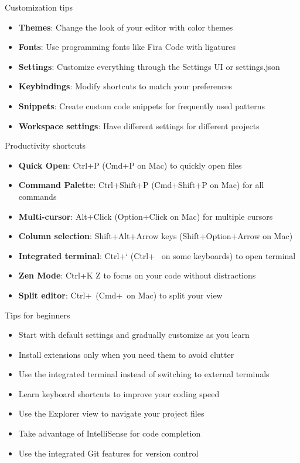 \begin{frame}[fragile]{Customization tips}
	\begin{itemize}
		\item \textbf{Themes}: Change the look of your editor with color themes
		\item \textbf{Fonts}: Use programming fonts like Fira Code with ligatures
		\item \textbf{Settings}: Customize everything through the Settings UI or settings.json
		\item \textbf{Keybindings}: Modify shortcuts to match your preferences
		\item \textbf{Snippets}: Create custom code snippets for frequently used patterns
		\item \textbf{Workspace settings}: Have different settings for different projects
	\end{itemize}
\end{frame}

\begin{frame}[fragile]{Productivity shortcuts}
	\begin{itemize}
		\item \textbf{Quick Open}: Ctrl+P (Cmd+P on Mac) to quickly open files
		\item \textbf{Command Palette}: Ctrl+Shift+P (Cmd+Shift+P on Mac) for all commands
		\item \textbf{Multi-cursor}: Alt+Click (Option+Click on Mac) for multiple cursors
		\item \textbf{Column selection}: Shift+Alt+Arrow keys (Shift+Option+Arrow on Mac)
		\item \textbf{Integrated terminal}: Ctrl+` (Ctrl+~ on some keyboards) to open terminal
		\item \textbf{Zen Mode}: Ctrl+K Z to focus on your code without distractions
		\item \textbf{Split editor}: Ctrl+\ (Cmd+\ on Mac) to split your view
	\end{itemize}
\end{frame}

\begin{frame}[fragile]{Tips for beginners}
	\begin{itemize}
		\item Start with default settings and gradually customize as you learn
		\item Install extensions only when you need them to avoid clutter
		\item Use the integrated terminal instead of switching to external terminals
		\item Learn keyboard shortcuts to improve your coding speed
		\item Use the Explorer view to navigate your project files
		\item Take advantage of IntelliSense for code completion
		\item Use the integrated Git features for version control
	\end{itemize}
\end{frame}